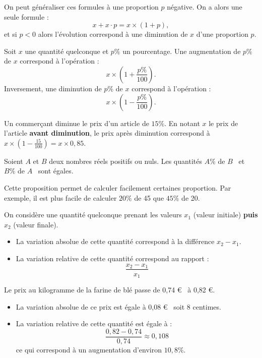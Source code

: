 \documentclass[a4paper, 12pt]{report}
\begin{document}
\begin{rmq}
On peut généraliser ces formules à une proportion $p$ négative. On a alors une seule formule :
\[ x + x\cdot p = x \times (1+p) , \]
et si $p<0$ alors l'évolution correspond à une diminution de $x$ d'une proportion $p$.
\end{rmq}

\begin{prop}
Soit $x$ une quantité quelconque et $p \%$ un pourcentage. Une augmentation de $p \%$ de $x$ correspond à l'opération :
\[ x \times \left (1 + \dfrac{p \%}{100} \right ) . \]
Inversement, une diminution de $p \%$ de $x$ correspond à l'opération :
\[ x \times \left (1 - \dfrac{p \%}{100} \right) . \]
\end{prop}

\begin{ex}
Un commerçant diminue le prix d'un article de $15 \%$. En notant $x$ le prix de l'article \textbf{avant diminution}, 
le prix après diminution correspond à $x \times \left ( 1 - \frac{15}{100} \right ) = x \times 0,85$.
\end{ex}

\begin{prop}
Soient $A$ et $B$ deux nombres réels positifs ou nuls.
Les quantités \og $A\%$ de $B$ \fg ~et \og $B\%$ de $A$ \fg ~sont égales.
\end{prop}

\begin{rmq}
Cette proposition permet de calculer facilement certaines proportion. 
Par exemple, il est plus facile de calculer $20 \%$ de 45 que $45 \%$ de 20.
\end{rmq}

\begin{defn}
On considère une quantité quelconque prenant les valeurs $x_1$ (valeur initiale) \textbf{puis} $x_2$ (valeur finale).
\begin{itemize}
\item
La variation absolue de cette quantité correspond à la différence $x_2 - x_1$.
\item 
La variation relative de cette quantité correspond au rapport  :
\[ \dfrac{x_2 - x_1}{x_1} \]
\end{itemize}
\end{defn}

\begin{ex}
Le prix au kilogramme de la farine de blé passe de 0,74 \euro~ à 0,82 \euro.
\begin{itemize}
\item
La variation absolue de ce prix est égale à 0,08 \euro~ soit 8 centimes.
\item 
La variation relative de cette quantité est égale à :
\[ \dfrac{0,82 - 0,74}{0,74} \approx 0,108 \] 
ce qui correspond à un augmentation d'environ $10,8 \%$.
\end{itemize}
\end{ex}
\end{document}
